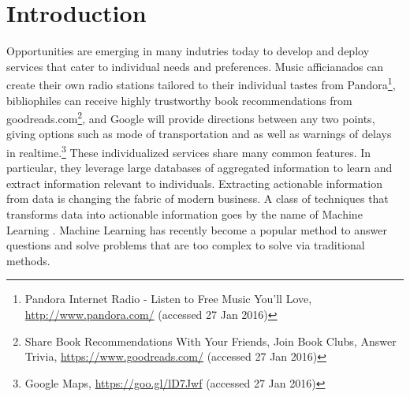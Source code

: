 \documentclass[10pt,letterpaper]{article}
\begin{document}
\section*{Introduction}
\label{sec:introduction}


Opportunities are emerging in many indutries today to develop and deploy services that cater to individual needs and preferences. Music afficianados can create their own radio stations tailored to their individual tastes from Pandora\footnote{Pandora Internet Radio - Listen to Free Music You'll Love, \url{http://www.pandora.com/} (accessed 27 Jan 2016)}, bibliophiles can receive 
highly trustworthy book recommendations from goodreads.com\footnote{Share Book Recommendations With Your Friends, Join Book Clubs, Answer Trivia, \url{https://www.goodreads.com/} (accessed 27 Jan 2016)}, and Google will provide directions between any two points, giving options such as mode of transportation and as well as warnings of delays in realtime.\footnote{Google Maps, \url{https://goo.gl/lD7Jwf} (accessed 27 Jan 2016)}
These individualized services share many common features. In particular, they leverage large databases of aggregated information to learn and extract information relevant to individuals.  
Extracting actionable information from data is changing the fabric of modern business. A class of techniques that transforms data into actionable information goes by the name of Machine Learning \cite{pythonmachinelearning}.
Machine Learning has recently become a popular method to answer questions and solve problems that are too complex to solve via traditional methods. 
\end{document}
